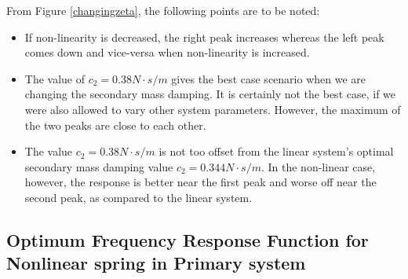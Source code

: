 From Figure \ref{changingzeta}, the following points are to be noted:
\begin{itemize}
\item If non-linearity is decreased, the right peak increases whereas the left peak comes down and vice-versa when non-linearity is increased.

\item The value of $c_{2} = 0.38 N \cdot s/m$ gives the best case scenario when we are changing the secondary mass damping. It is certainly not the best case, if we were also allowed to vary other system parameters. However, the maximum of the two peaks are close to each other.
\item The value $c_{2} = 0.38 N \cdot s/m$ is not too offset from the linear system's optimal secondary mass damping value $c_{2} = 0.344 N \cdot s/m$. In the non-linear case, however, the response is better near the first peak and worse off near the second peak, as compared to the linear system.
\end{itemize}

\subsection{Optimum Frequency Response Function for Nonlinear spring in Primary system}

